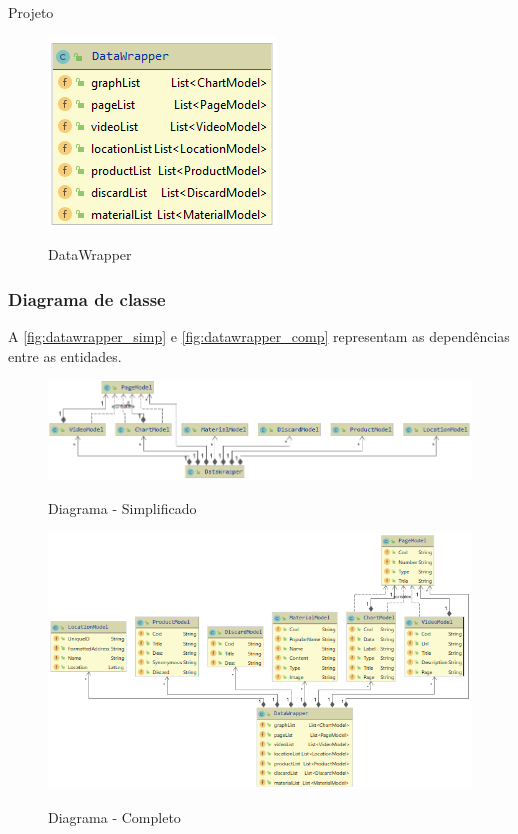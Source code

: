 \documentclass[
	12pt,				%
	openany,			%
	twoside,			%
	a4paper,			%
	english,			%
	french,				%
	spanish,			%
	brazil				%
	]{abntex2}
\begin{document}
\begin{chapter}{Projeto}
\begin{enumerate}
\begin{itemize}
\end{itemize}
\begin{figure}[h]
\centering
   \caption{DataWrapper}
   \includegraphics[scale=1.0]{media/DataWrapperModel.png}
     \label{fig:datawrapper}
\end{figure}
\end{enumerate}

\newpage
\subsubsection{Diagrama de classe}
A \autoref{fig:datawrapper_simp} e \autoref{fig:datawrapper_comp} representam as dependências entre as entidades.

\begin{figure}[h]
\centering
   \caption{Diagrama - Simplificado}
   \includegraphics[scale=0.7]{media/DataWrapper_.png}
     \label{fig:datawrapper_simp}
\end{figure}

\begin{figure}[h]
\centering
   \caption{Diagrama - Completo}
   \includegraphics[scale=0.85]{media/DataWrapper.png}
     \label{fig:datawrapper_comp}
\end{figure}


\end{chapter}
\end{document}
